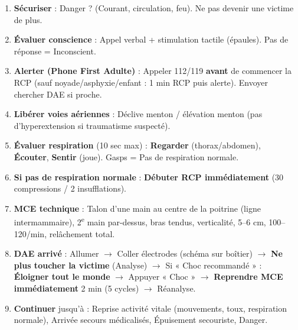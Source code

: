 \documentclass[11pt]{article}
\newcommand{\cle}[1]{{\popxbold\color{popdark}#1}}
\newcounter{popsec}
\newcounter{popsub}
\newcommand{\courssub}[1]{%
  \stepcounter{popsub}%
  \par\vspace{9pt}\noindent{\popxbold\fontsize{11.5}{13}\selectfont\color{popink}{\color{poporange}\thepopsec.\thepopsub}\hspace{6pt}#1}\par\nopagebreak\vspace{4pt}
}
\begin{document}
\courssub{Je m'entraîne}

\begin{methode}
\begin{enumerate}
    \item \textbf{Sécuriser} : Danger ? (Courant, circulation, feu). \cle{Ne pas devenir une victime de plus}.
    \item \textbf{Évaluer conscience} : Appel verbal + stimulation tactile (épaules). \cle{Pas de réponse = Inconscient}.
    \item \textbf{Alerter (Phone First Adulte)} : Appeler 112/119 \textbf{avant} de commencer la RCP (sauf noyade/asphyxie/enfant : 1 min RCP puis alerte). Envoyer chercher DAE si proche.
    \item \textbf{Libérer voies aériennes} : Déclive menton / élévation menton (pas d'hyperextension si traumatisme suspecté).
    \item \textbf{Évaluer respiration} (10 sec max) : \textbf{Regarder} (thorax/abdomen), \textbf{Écouter}, \textbf{Sentir} (joue). \cle{Gasps = Pas de respiration normale}.
    \item \textbf{Si pas de respiration normale} : \textbf{Débuter RCP immédiatement} (30 compressions / 2 insufflations).
    \item \textbf{MCE technique} : Talon d'une main au centre de la poitrine (ligne intermammaire), 2\textsuperscript{e} main par-dessus, bras tendus, verticalité, 5--6 cm, 100--120/min, relâchement total.
    \item \textbf{DAE arrivé} : Allumer $\rightarrow$ Coller électrodes (schéma sur boîtier) $\rightarrow$ \textbf{Ne plus toucher la victime} (Analyse) $\rightarrow$ Si « Choc recommandé » : \textbf{Éloigner tout le monde} $\rightarrow$ Appuyer « Choc » $\rightarrow$ \textbf{Reprendre MCE immédiatement} 2 min (5 cycles) $\rightarrow$ Réanalyse.
    \item \textbf{Continuer} jusqu'à : Reprise activité vitale (mouvements, toux, respiration normale), Arrivée secours médicalisés, Épuisement secouriste, Danger.
\end{enumerate}
\end{methode}
\end{document}
